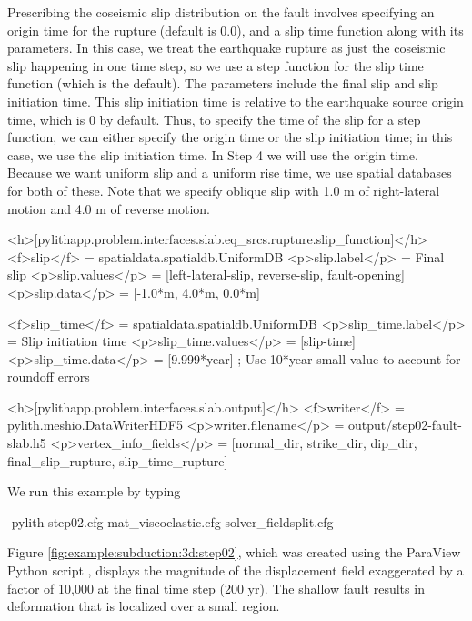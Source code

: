 Prescribing the coseismic slip distribution on the fault involves
specifying an origin time for the rupture (default is 0.0), and a slip
time function along with its parameters. In this case, we treat the
earthquake rupture as just the coseismic slip happening in one time
step, so we use a step function for the slip time function (which is
the default). The parameters include the final slip and slip
initiation time. This slip initiation time is relative to the
earthquake source origin time, which is 0 by default. Thus, to specify
the time of the slip for a step function, we can either specify the
origin time or the slip initiation time; in this case, we use the slip
initiation time. In Step 4 we will use the origin time. Because we
want uniform slip and a uniform rise time, we use 
spatial databases for both of these. Note that we specify oblique slip
with 1.0 m of right-lateral motion and 4.0 m of reverse motion.
\begin{cfg}
<h>[pylithapp.problem.interfaces.slab.eq_srcs.rupture.slip_function]</h>
<f>slip</f> = spatialdata.spatialdb.UniformDB
<p>slip.label</p> = Final slip
<p>slip.values</p> = [left-lateral-slip, reverse-slip, fault-opening]
<p>slip.data</p> = [-1.0*m, 4.0*m, 0.0*m] 

<f>slip_time</f> = spatialdata.spatialdb.UniformDB
<p>slip_time.label</p>  = Slip initiation time
<p>slip_time.values</p> = [slip-time]
<p>slip_time.data</p> = [9.999*year] ; Use 10*year-small value to account for roundoff errors

<h>[pylithapp.problem.interfaces.slab.output]</h>
<f>writer</f> = pylith.meshio.DataWriterHDF5
<p>writer.filename</p> = output/step02-fault-slab.h5
<p>vertex_info_fields</p> = [normal_dir, strike_dir, dip_dir, final_slip_rupture, slip_time_rupture]
\end{cfg}

We run this example by typing
\begin{shell}
$$ pylith step02.cfg mat_viscoelastic.cfg solver_fieldsplit.cfg
\end{shell}

Figure \vref{fig:example:subduction:3d:step02}, which was created
using the ParaView Python script ,
displays the magnitude of the displacement field exaggerated by a
factor of 10,000 at the final time step (200 yr).  The shallow
fault results in deformation that is localized over a small region.

